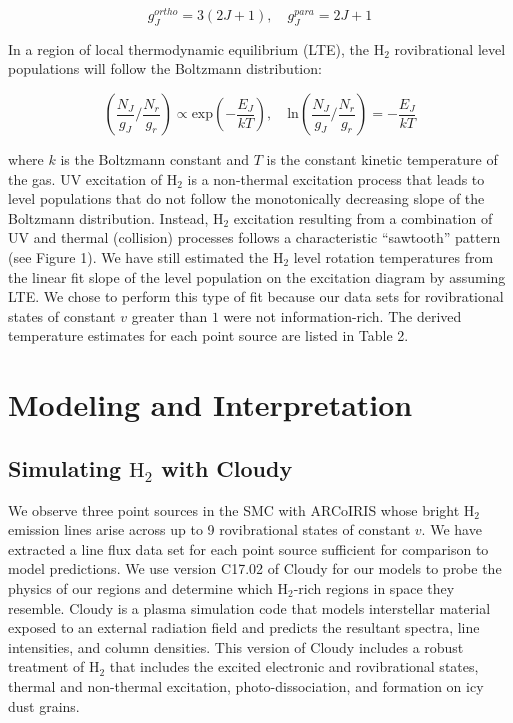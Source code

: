 \documentclass[12pt, letterpaper]{book}
\begin{document}
\begin{equation} \label{eq:ortho_para}
	g^{ortho}_{J} = 3(2J + 1),\quad g^{para}_{J} = 2J + 1
\end{equation}

In a region of local thermodynamic equilibrium (LTE), the $\textrm{H}_2$ rovibrational level populations will follow the Boltzmann distribution:

\begin{equation} \label{eq:boltzmann}
	\left( \frac{N_J}{g_J} / \frac{N_r}{g_r} \right) \propto \textrm{exp}\left( -\frac{E_J}{kT} \right),\quad \textrm{ln}\left( \frac{N_J}{g_J} / \frac{N_r}{g_r} \right) = -\frac{E_J}{kT}
\end{equation}

\noindent where $k$ is the Boltzmann constant and $T$ is the constant kinetic temperature of the gas. UV excitation of $\textrm{H}_2$ is a non-thermal excitation process that leads to level populations that do not follow the monotonically decreasing slope of the Boltzmann distribution. Instead, $\textrm{H}_2$ excitation resulting from a combination of UV and thermal (collision) processes follows a characteristic ``sawtooth'' pattern (see Figure 1). We have still estimated the $\textrm{H}_2$ level rotation temperatures from the linear fit slope of the level population on the excitation diagram by assuming LTE. We chose to perform this type of fit because our data sets for rovibrational states of constant $v$ greater than $1$ were not information-rich. The derived temperature estimates for each point source are listed in Table 2.

\chapter{Modeling and Interpretation}
\label{chapter:model}

\section{Simulating $\textrm{H}_2$ with Cloudy}
We observe three point sources in the SMC with ARCoIRIS whose bright $\textrm{H}_2$ emission lines arise across up to 9 rovibrational states of constant $v$. We have extracted a line flux data set for each point source sufficient for comparison to model predictions. We use version C17.02 of Cloudy for our models to probe the physics of our regions and determine which $\textrm{H}_2$-rich regions in space they resemble. Cloudy is a plasma simulation code that models interstellar material exposed to an external radiation field and predicts the resultant spectra, line intensities, and column densities. This version of Cloudy includes a robust treatment of $\textrm{H}_2$ that includes the excited electronic and rovibrational states, thermal and non-thermal excitation, photo-dissociation, and formation on icy dust grains.
\end{document}
